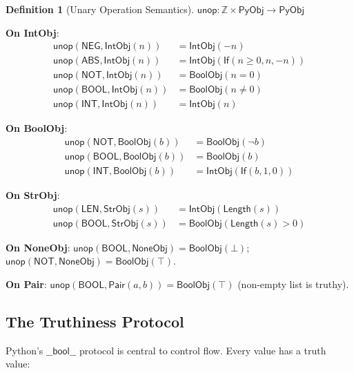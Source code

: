 \documentclass[11pt,a4paper]{report}
\theoremstyle{definition}
\newtheorem{definition}{Definition}[chapter]
\theoremstyle{plain}
\newcommand{\Int}{\mathbb{Z}}
\newcommand{\PyObj}{\mathsf{PyObj}}
\begin{document}
\begin{definition}[Unary Operation Semantics]
$\mathsf{unop} : \Int \times \PyObj \to \PyObj$

\textbf{On IntObj}:
\begin{align}
  \mathsf{unop}(\mathsf{NEG}, \mathsf{IntObj}(n)) &=
    \mathsf{IntObj}(-n) \\
  \mathsf{unop}(\mathsf{ABS}, \mathsf{IntObj}(n)) &=
    \mathsf{IntObj}(\mathsf{If}(n \geq 0, n, -n)) \\
  \mathsf{unop}(\mathsf{NOT}, \mathsf{IntObj}(n)) &=
    \mathsf{BoolObj}(n = 0) \\
  \mathsf{unop}(\mathsf{BOOL}, \mathsf{IntObj}(n)) &=
    \mathsf{BoolObj}(n \neq 0) \\
  \mathsf{unop}(\mathsf{INT}, \mathsf{IntObj}(n)) &=
    \mathsf{IntObj}(n)
\end{align}

\textbf{On BoolObj}:
\begin{align}
  \mathsf{unop}(\mathsf{NOT}, \mathsf{BoolObj}(b)) &=
    \mathsf{BoolObj}(\lnot b) \\
  \mathsf{unop}(\mathsf{BOOL}, \mathsf{BoolObj}(b)) &=
    \mathsf{BoolObj}(b) \\
  \mathsf{unop}(\mathsf{INT}, \mathsf{BoolObj}(b)) &=
    \mathsf{IntObj}(\mathsf{If}(b, 1, 0))
\end{align}

\textbf{On StrObj}:
\begin{align}
  \mathsf{unop}(\mathsf{LEN}, \mathsf{StrObj}(s)) &=
    \mathsf{IntObj}(\mathsf{Length}(s)) \\
  \mathsf{unop}(\mathsf{BOOL}, \mathsf{StrObj}(s)) &=
    \mathsf{BoolObj}(\mathsf{Length}(s) > 0)
\end{align}

\textbf{On NoneObj}: $\mathsf{unop}(\mathsf{BOOL}, \mathsf{NoneObj})
= \mathsf{BoolObj}(\bot)$; $\mathsf{unop}(\mathsf{NOT},
\mathsf{NoneObj}) = \mathsf{BoolObj}(\top)$.

\textbf{On Pair}: $\mathsf{unop}(\mathsf{BOOL},
\mathsf{Pair}(a, b)) = \mathsf{BoolObj}(\top)$ (non-empty list is
truthy).
\end{definition}

\subsection{The Truthiness Protocol}

Python's $\mathsf{\_\_bool\_\_}$ protocol is central to control flow.
Every value has a truth value:
\end{document}
